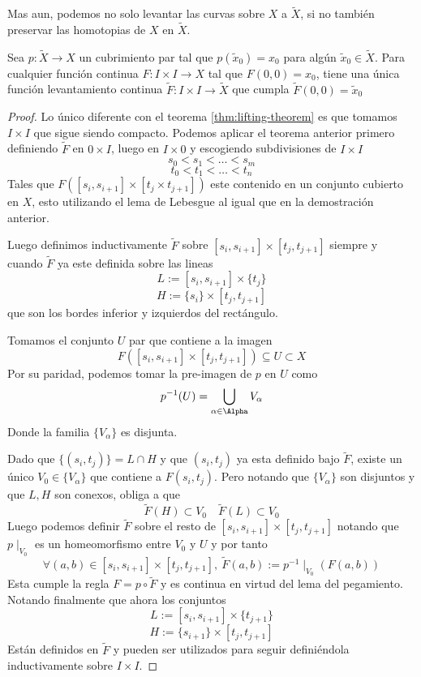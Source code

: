 Mas aun, podemos no solo levantar las curvas sobre \(X\) a \(\tilde X\),
si no también preservar las homotopias de \(X\) en \(\tilde X\).
\begin{corolario}
  Sea \(p : \tilde X \to X\) un cubrimiento par tal que \(p(\tilde x _0)
  = x_0 \) para algún \(\tilde x _0 \in \tilde X\). Para cualquier
  función continua \(F : I \times I \to X\) tal que \(F(0,0) = x_0\), tiene una
  única función levantamiento continua \(\tilde F : I \times I \to
  \tilde X\) que cumpla \(\tilde F (0,0) = \tilde x_0\)
\end{corolario}
\begin{proof}
  Lo único diferente con el teorema \ref{thm:lifting-theorem} es que
  tomamos \(I \times I\) que sigue siendo compacto. Podemos aplicar el
  teorema anterior primero definiendo \(\tilde F\) en \(0 \times I\),
  luego en \(I \times 0\) y escogiendo subdivisiones de \(I \times I\)
  \[ s_0 < s_1 < \dotsc < s_m \]
  \[ t_0 < t_1 < \dotsc < t_n \]
  Tales que \(F ([s_i , s_{i+1}] \times [t_j \times t_{j+1}])\) este
  contenido en un conjunto cubierto en \(X\), esto utilizando
  el lema de Lebesgue al igual que en la demostración anterior.

  Luego definimos inductivamente \(\tilde F\) sobre \([s_i, s_{i+1}]
  \times [t_j , t_{j+1}]\) siempre y cuando \(\tilde F\) ya este
  definida sobre las lineas
  \[ L := [s_i , s_{i+1}] \times \{t_j\}\]
  \[ H := \{s_i\} \times [t_j , t_{j+1}] \]
  que son los bordes inferior y izquierdos del rectángulo.

  Tomamos el conjunto \(U\) par que contiene a la imagen
  \[ F([s_i , s_{i+1}] \times [t_j , t_{j+1}]) \subseteq U \subset X \]
  Por su paridad, podemos tomar la pre-imagen de \(p\) en \(U\) como
  \[ p^{-1}(U) = \bigcup_{\alpha \in \Alpha} V_\alpha\]
  Donde la familia \(\{V_\alpha\}\) es disjunta.

  Dado que \( \{(s_i, t_j)\} = L \cap H\) y que \( (s_i , t_j) \) ya
  esta definido bajo \(\tilde F\), existe un único \(V_0 \in
  \{V_\alpha\}\) que contiene a \(F (s_i, t_j)\). Pero notando que
  \(\{V_\alpha\}\) son disjuntos y que \(L,H\) son conexos, obliga a que
  \[ \tilde F (H) \subset V_0 \quad \tilde F (L) \subset V_0 \]
  Luego podemos definir \(\tilde F\) sobre el resto de \([s_i,
    s_{i+1}] \times [t_j , t_{j+1}]\) notando que \(p \mid_{V_0}\) es
  un homeomorfismo entre \(V_0\) y \(U\) y por tanto
  \[ \forall (a,b) \in [s_i, s_{i+1}] \times [t_j , t_{j+1}],
    \ \tilde F (a,b) := p^{-1} \mid_{V_0} (F(a,b)) \]
  Esta cumple la regla \( F = p \circ \tilde F\) y es continua en virtud
  del lema del pegamiento. Notando finalmente que ahora los conjuntos
  \[ L := [s_i , s_{i+1}] \times \{t_{j+1}\}\]
  \[ H := \{s_{i+1}\} \times [t_j , t_{j+1}] \]
  Están definidos en \(\tilde F\) y pueden ser utilizados para seguir
  definiéndola inductivamente sobre \(I \times I\).
\end{proof}

